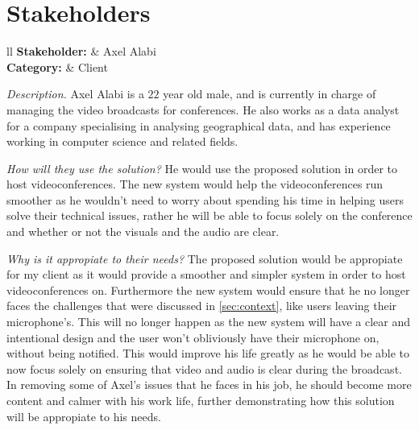 \section{Stakeholders}

\begin{tblr}{ll}
  \textbf{Stakeholder: } & Axel Alabi\\
  \textbf{Category: } & Client\\
\end{tblr}
\vspace{0.2cm}

\textit{Description.} %
Axel Alabi is a $22$ year old male, and is currently in charge 
of managing the video broadcasts for conferences. He also
works as a data analyst for a company specialising in analysing
geographical data, and has experience working in computer 
science and related fields. \vspace{0.2cm}

\textit{How will they use the solution?} %
He would use the proposed solution in order to host
videoconferences. The new system would help the 
videoconferences run smoother as he wouldn't need to worry 
about spending his time in helping users solve their technical
issues, rather he will be able to focus solely on the
conference and whether or not the visuals and the audio are
clear. \vspace{0.2cm}

\textit{Why is it appropiate to their needs?} %
The proposed solution would be appropiate for my client as it
would provide a smoother and simpler system in order to host 
videoconferences on. Furthermore the new system would ensure
that he no longer faces the challenges that were discussed
in \ref{sec:context}, like users leaving their microphone's.
This will no longer happen as the new system will have a 
clear and intentional design and the user won't obliviously 
have their microphone on, without being notified. This would 
improve his life greatly as he would be able to now focus 
solely on ensuring that video and audio is clear during the 
broadcast. In removing some of Axel's issues that he faces in
his job, he should become more content and calmer with his
work life, further demonstrating how this solution will be 
appropiate to his needs.

\vspace{0.2cm}

